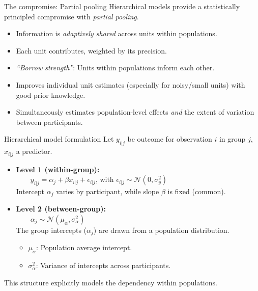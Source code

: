 \documentclass[aspectratio=169]{beamer}
\begin{document}
\begin{frame}{The compromise: Partial pooling}
    Hierarchical models provide a statistically principled compromise with \textit{partial pooling}.
    
    \pause
    \begin{itemize}
        \item Information is \emph{adaptively shared} across units within populations.
        \pause
        \item Each unit contributes, weighted by its precision.
        \pause
        \item \emph{``Borrow strength''}: Units within populations inform each other.
        \pause
        \item Improves individual unit estimates (especially for noisy/small units) with good prior knowledge.
        \pause
        \item Simultaneously estimates population-level effects \emph{and} the extent of variation between participants.
    \end{itemize}
\end{frame}

\begin{frame}[fragile]{Hierarchical model formulation}
    Let $y_{i|j}$ be outcome for observation $i$ in group $j$, $x_{i|j}$ a predictor.
    \pause

    \begin{itemize}
        \item \textbf{Level 1 (within-group):}
        \\[1ex]
          $ \qquad y_{i|j} = \alpha_j + \beta x_{i|j} + \epsilon_{i|j}$, with $\epsilon_{i|j} \sim \mathcal{N}(0, \sigma^2_y)$
        \\[1ex]
          Intercept $\alpha_j$ varies by participant, while slope $\beta$ is fixed (common).
        \pause
        \item \textbf{Level 2 (between-group):}
        \\[1ex]
          $ \qquad \alpha_j \sim \mathcal{N}(\mu_{\alpha}, \sigma^2_{\alpha}) $
        \\[1ex]
          The group intercepts ($\alpha_j$) are drawn from a population distribution.
        \\[1ex]
          \begin{itemize}
            \item $\mu_{\alpha}$: Population average intercept.
            \item $\sigma^2_{\alpha}$: Variance of intercepts across participants.
          \end{itemize}
    \end{itemize}
    \pause
    \vfill
    This structure explicitly models the dependency within populations.
\end{frame}
\end{document}

